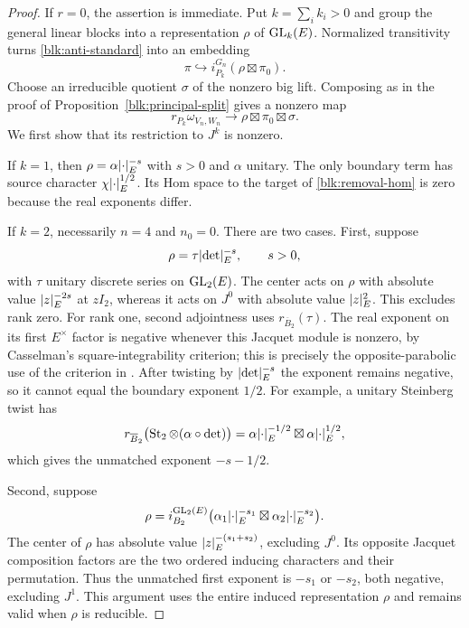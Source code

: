 \begin{proof}
If $r=0$, the assertion is immediate.  Put $k=\sum_i k_i>0$ and group
the general linear blocks into a representation $\rho$ of $\operatorname{GL}_k(E)$.
Normalized transitivity turns \eqref{blk:anti-standard} into an
embedding
\[
 \pi\hookrightarrow i_{P_k}^{G_n}(\rho\boxtimes\pi_0).
\]
Choose an irreducible quotient $\sigma$ of the nonzero big lift.
Composing as in the proof of Proposition~\ref{blk:principal-split}
gives a nonzero map
\begin{equation}
 r_{P_k}\omega_{V_n,W_n}\longrightarrow
         \rho\boxtimes\pi_0\boxtimes\sigma.
 \label{blk:removal-hom}
\end{equation}
We first show that its restriction to $J^k$ is nonzero.

If $k=1$, then $\rho=\alpha\lvert\cdot\rvert_E^{-s}$ with $s>0$ and
$\alpha$ unitary.  The only boundary term has source character
$\chi\lvert\cdot\rvert_E^{1/2}$.  Its Hom space to the target of
\eqref{blk:removal-hom} is zero because the real exponents differ.

If $k=2$, necessarily $n=4$ and $n_0=0$.  There are two cases.  First,
suppose
\[
 \rho=\tau\lvert\det\rvert_E^{-s},\qquad s>0,
\]
with $\tau$ unitary discrete series on $\operatorname{GL}_2(E)$.  The center acts on
$\rho$ with absolute value $\lvert z\rvert_E^{-2s}$ at $zI_2$, whereas it acts
on $J^0$ with absolute value $\lvert z\rvert_E^2$.  This excludes rank zero.
For rank one, second adjointness uses $r_{\overline B_2}(\tau)$.
The real exponent on its first $E^\times$ factor is negative whenever
this Jacquet module is nonzero, by Casselman's square-integrability
criterion; this is precisely the opposite-parabolic use of the
criterion in \cite[Appendix~C.1, equations~(C.1)--(C.2)]{GanIchinoFormal}.
After twisting by $\lvert\det\rvert_E^{-s}$ the exponent remains negative,
so it cannot equal the boundary exponent $1/2$.  For example, a
unitary Steinberg twist has
\[
 r_{\overline B_2}\bigl(\operatorname{St}_2\otimes(\alpha\circ\det)\bigr)
 =\alpha\lvert\cdot\rvert_E^{-1/2}
       \boxtimes\alpha\lvert\cdot\rvert_E^{1/2},
\]
which gives the unmatched exponent $-s-1/2$.

Second, suppose
\[
 \rho=i_{B_2}^{\operatorname{GL}_2(E)}
       \bigl(\alpha_1\lvert\cdot\rvert_E^{-s_1}
             \boxtimes\alpha_2\lvert\cdot\rvert_E^{-s_2}\bigr).
\]
The center of $\rho$ has absolute value
$\lvert z\rvert_E^{-(s_1+s_2)}$, excluding $J^0$.  Its opposite Jacquet
composition factors are the two ordered inducing characters and their
permutation.  Thus the unmatched first exponent is $-s_1$ or $-s_2$,
both negative, excluding $J^1$.  This argument uses the entire induced
representation $\rho$ and remains valid when $\rho$ is reducible.


\end{proof}
